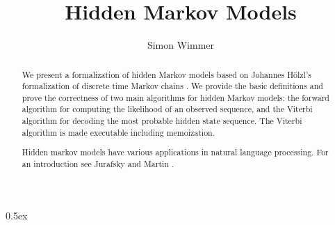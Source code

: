 \documentclass[11pt,a4paper]{article}
\begin{document}
\title{Hidden Markov Models}
\author{Simon Wimmer}
\maketitle

\begin{abstract}
We present a formalization of hidden Markov models \cite{Markov13}
based on Johannes Hölzl's formalization of discrete time Markov chains \cite{hoelzl2017mdp}.
We provide the basic definitions and prove the correctness of two main algorithms for
hidden Markov models: the forward algorithm for computing the likelihood of an observed sequence,
and the Viterbi algorithm for decoding the most probable hidden state sequence.
The Viterbi algorithm is made executable including memoization.

Hidden markov models have various applications in natural language processing.
For an introduction see Jurafsky and Martin \cite{Jurafsky}.

\end{abstract}

\tableofcontents

\pagebreak

\parindent 0pt\parskip 0.5ex





\end{document}

